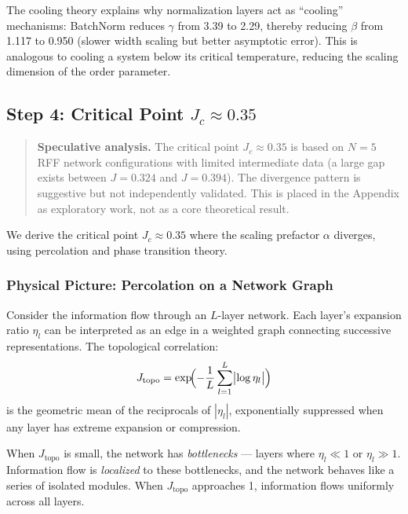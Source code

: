 The cooling theory explains why normalization layers act as ``cooling'' mechanisms: BatchNorm reduces $\gamma$ from 3.39 to 2.29, thereby reducing $\beta$ from 1.117 to 0.950 (slower width scaling but better asymptotic error). This is analogous to cooling a system below its critical temperature, reducing the scaling dimension of the order parameter.



\subsection{Step 4: Critical Point $J_c \approx 0.35$}\label{sec:critical-point}

\begin{quote}
\textbf{Speculative analysis.} The critical point $J_c \approx 0.35$ is based on $N=5$ RFF network configurations with limited intermediate data (a large gap exists between $J=0.324$ and $J=0.394$). The divergence pattern is suggestive but not independently validated. This is placed in the Appendix as exploratory work, not as a core theoretical result.
\end{quote}

We derive the critical point $J_c \approx 0.35$ where the scaling prefactor $\alpha$ diverges, using percolation and phase transition theory.

\subsubsection{Physical Picture: Percolation on a Network Graph}

Consider the information flow through an $L$-layer network. Each layer's expansion ratio $\eta_l$ can be interpreted as an edge in a weighted graph connecting successive representations. The topological correlation:
\begin{equation}
J_{\mathrm{topo}} = \exp\!\Bigl(-\frac{1}{L}\sum_{l=1}^{L}\bigl|\log \eta_l\bigr|\Bigr)
\end{equation}
is the geometric mean of the reciprocals of $|\eta_l|$, exponentially suppressed when any layer has extreme expansion or compression.

When $J_{\mathrm{topo}}$ is small, the network has \emph{bottlenecks} --- layers where $\eta_l \ll 1$ or $\eta_l \gg 1$. Information flow is \emph{localized} to these bottlenecks, and the network behaves like a series of isolated modules. When $J_{\mathrm{topo}}$ approaches 1, information flows uniformly across all layers.

